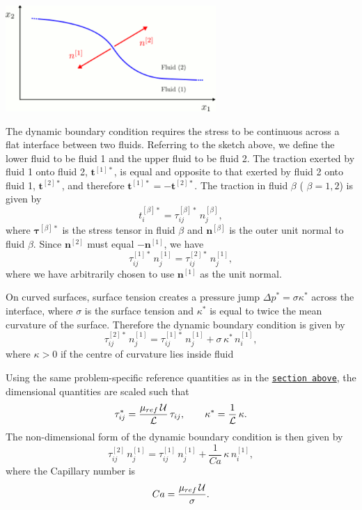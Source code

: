 \begin{DoxyImage}
\includegraphics[width=0.6\textwidth]{free_surface_sketch}
\end{DoxyImage}


The dynamic boundary condition requires the stress to be continuous across a flat interface between two fluids. Referring to the sketch above, we define the lower fluid to be fluid 1 and the upper fluid to be fluid 2. The traction exerted by fluid 1 onto fluid 2, $ \mathbf{t}^{[1]*} $, is equal and opposite to that exerted by fluid 2 onto fluid 1, $ \mathbf{t}^{[2]*} $, and therefore $ \mathbf{t}^{[1]*} = - \mathbf{t}^{[2]*} $. The traction in fluid $ \beta $ ( $ \beta = 1,2 $) is given by \[ t_i^{[\beta]*} = \tau_{ij}^{[\beta]*} \, n_j^{[\beta]}, \] where $ \mathbf{\tau}^{[\beta]*} $ is the stress tensor in fluid $ \beta $ and $ \mathbf{n}^{[\beta]} $ is the outer unit normal to fluid $ \beta $. Since $ \mathbf{n}^{[2]} $ must equal $ -\mathbf{n}^{[1]} $, we have \[ \tau_{ij}^{[1]*} \, n_j^{[1]} = \tau_{ij}^{[2]*} \, n_j^{[1]}, \] where we have arbitrarily chosen to use $ \mathbf{n}^{[1]} $ as the unit normal.

On curved surfaces, surface tension creates a pressure jump $ \Delta p^* = \sigma \kappa^* $ across the interface, where $ \sigma $ is the surface tension and $ \kappa^* $ is equal to twice the mean curvature of the surface. Therefore the dynamic boundary condition is given by \[ \tau_{ij}^{[2]*} \, n_j^{[1]} = \tau_{ij}^{[1]*} \, n_j^{[1]} + \sigma \, \kappa^* \, n_i^{[1]}, \] where $ \kappa > 0 $ if the centre of curvature lies inside fluid
\begin{DoxyEnumerate}
\item Using the same problem-\/specific reference quantities as in the \href{#kinematic_condition_theory}{\tt section above}, the dimensional quantities are scaled such that \[ \tau_{ij}^* = \frac{\mu_{ref} \, {\cal U}}{{\cal L}} \, \tau_{ij}, \qquad \kappa^* = \frac{1}{{\cal L}} \, \kappa. \] The non-\/dimensional form of the dynamic boundary condition is then given by \[ \tau_{ij}^{[2]} \, n_j^{[1]} = \tau_{ij}^{[1]} \, n_j^{[1]} + \frac{1}{Ca} \, \kappa \, n_i^{[1]}, \] where the Capillary number is \[ Ca = \frac{\mu_{ref} \, {\cal U}}{\sigma}. \]
\end{DoxyEnumerate}

